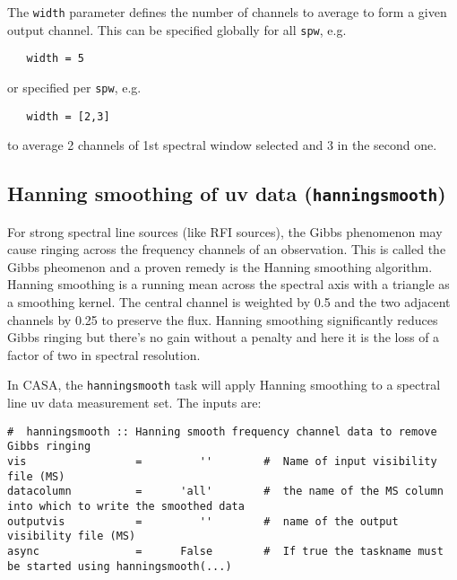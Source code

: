 The {\tt width} parameter defines the number of channels to average to
form a given output channel.  This can be specified globally for all
{\tt spw}, e.g.

\small
\begin{verbatim}
   width = 5
\end{verbatim}
\normalsize

or specified per {\tt spw}, e.g.

\small
\begin{verbatim}
   width = [2,3]
\end{verbatim}
\normalsize

to average 2 channels of 1st spectral window selected and 3 in the 
second one.



\subsection{Hanning smoothing of uv data ({\tt hanningsmooth})}
\label{section:cal.other.hanningsmooth}

For strong spectral line sources (like RFI sources), the Gibbs
phenomenon may cause ringing across the frequency channels of an
observation. This is called the Gibbs pheomenon and a proven remedy is
the Hanning smoothing algorithm. Hanning smoothing is a running mean
across the spectral axis with a triangle as a smoothing kernel. The
central channel is weighted by 0.5 and the two adjacent channels by
0.25 to preserve the flux. Hanning smoothing significantly reduces
Gibbs ringing but there's no gain without a penalty and here it is the
loss of a factor of two in spectral resolution.

In CASA, the {\tt hanningsmooth} task will apply Hanning smoothing to a
spectral line uv data measurement set.  The inputs are:

\small
\begin{verbatim}
#  hanningsmooth :: Hanning smooth frequency channel data to remove Gibbs ringing
vis                 =         ''        #  Name of input visibility file (MS)
datacolumn          =      'all'        #  the name of the MS column into which to write the smoothed data
outputvis           =         ''        #  name of the output visibility file (MS)
async               =      False        #  If true the taskname must be started using hanningsmooth(...)
\end{verbatim}
\normalsize

